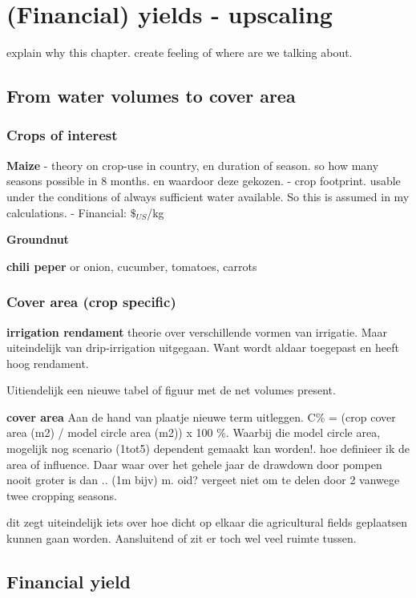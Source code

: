 \chapter{(Financial) yields - upscaling}
explain why this chapter. create feeling of where are we talking about. 

\section{From water volumes to cover area}

\subsection{Crops of interest}

\textbf{Maize}
- theory on crop-use in country, en duration of season. so how many seasons possible in 8 months. en waardoor deze gekozen. 
- crop footprint. usable under the conditions of always sufficient water available. So this is assumed in my calculations.
- Financial: $\$_{US}$/kg 

\textbf{Groundnut}

\textbf{chili peper}
or onion, cucumber, tomatoes, carrots


\subsection{Cover area (crop specific)}

\textbf{irrigation rendament} 
theorie over verschillende vormen van irrigatie. Maar uiteindelijk van drip-irrigation uitgegaan. Want wordt aldaar toegepast en heeft hoog rendament.

Uitiendelijk een nieuwe tabel of figuur met de net volumes present. 

\textbf{cover area} 
Aan de hand van plaatje nieuwe term uitleggen. C\% = (crop cover area (m2) / model circle area (m2)) x 100 \%. Waarbij die model circle area, mogelijk nog scenario (1tot5) dependent gemaakt kan worden!. hoe definieer ik de area of influence. Daar waar over het gehele jaar de drawdown door pompen nooit groter is dan .. (1m bijv) m. oid?
vergeet niet om te delen door 2 vanwege twee cropping seasons. 

dit zegt uiteindelijk iets over hoe dicht op elkaar die agricultural fields geplaatsen kunnen gaan worden. Aansluitend of zit er toch wel veel ruimte tussen. 

\section{Financial yield}

